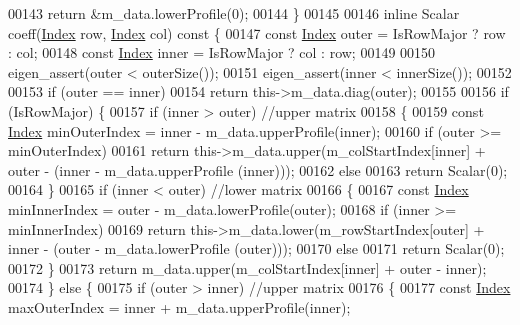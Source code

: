 \begin{DoxyCode}
00143         \textcolor{keywordflow}{return} &m\_data.lowerProfile(0);
00144     \}
00145 
00146     \textcolor{keyword}{inline} Scalar coeff(\hyperlink{namespace_eigen_a62e77e0933482dafde8fe197d9a2cfde}{Index} row, \hyperlink{namespace_eigen_a62e77e0933482dafde8fe197d9a2cfde}{Index} col)\textcolor{keyword}{ const }\{
00147         \textcolor{keyword}{const} \hyperlink{namespace_eigen_a62e77e0933482dafde8fe197d9a2cfde}{Index} outer = IsRowMajor ? row : col;
00148         \textcolor{keyword}{const} \hyperlink{namespace_eigen_a62e77e0933482dafde8fe197d9a2cfde}{Index} inner = IsRowMajor ? col : row;
00149 
00150         eigen\_assert(outer < outerSize());
00151         eigen\_assert(inner < innerSize());
00152 
00153         \textcolor{keywordflow}{if} (outer == inner)
00154             \textcolor{keywordflow}{return} this->m\_data.diag(outer);
00155 
00156         \textcolor{keywordflow}{if} (IsRowMajor) \{
00157             \textcolor{keywordflow}{if} (inner > outer) \textcolor{comment}{//upper matrix}
00158             \{
00159                 \textcolor{keyword}{const} \hyperlink{namespace_eigen_a62e77e0933482dafde8fe197d9a2cfde}{Index} minOuterIndex = inner - m\_data.upperProfile(inner);
00160                 \textcolor{keywordflow}{if} (outer >= minOuterIndex)
00161                     \textcolor{keywordflow}{return} this->m\_data.upper(m\_colStartIndex[inner] + outer - (inner - m\_data.upperProfile
      (inner)));
00162                 \textcolor{keywordflow}{else}
00163                     \textcolor{keywordflow}{return} Scalar(0);
00164             \}
00165             \textcolor{keywordflow}{if} (inner < outer) \textcolor{comment}{//lower matrix}
00166             \{
00167                 \textcolor{keyword}{const} \hyperlink{namespace_eigen_a62e77e0933482dafde8fe197d9a2cfde}{Index} minInnerIndex = outer - m\_data.lowerProfile(outer);
00168                 \textcolor{keywordflow}{if} (inner >= minInnerIndex)
00169                     \textcolor{keywordflow}{return} this->m\_data.lower(m\_rowStartIndex[outer] + inner - (outer - m\_data.lowerProfile
      (outer)));
00170                 \textcolor{keywordflow}{else}
00171                     \textcolor{keywordflow}{return} Scalar(0);
00172             \}
00173             \textcolor{keywordflow}{return} m\_data.upper(m\_colStartIndex[inner] + outer - inner);
00174         \} \textcolor{keywordflow}{else} \{
00175             \textcolor{keywordflow}{if} (outer > inner) \textcolor{comment}{//upper matrix}
00176             \{
00177                 \textcolor{keyword}{const} \hyperlink{namespace_eigen_a62e77e0933482dafde8fe197d9a2cfde}{Index} maxOuterIndex = inner + m\_data.upperProfile(inner);

\end{DoxyCode}
